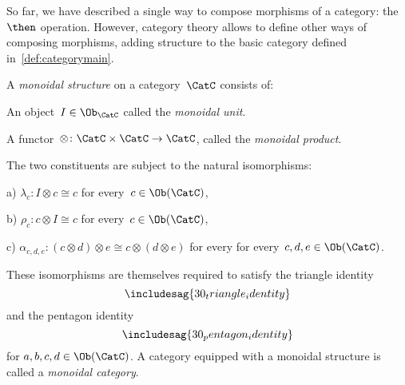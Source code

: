 So far, we have described a single way to compose morphisms of a category: the~$\then$ operation. However, category theory allows to define other ways of composing morphisms, adding structure to the basic category defined in~\cref{def:categorymain}.
\begin{ctdefinition}\label{def:monoidal_cat}
A \emph{monoidal structure} on a category~$\CatC$ consists of:
\begin{compactenum}
    \item An object~$I\in \Ob_\CatC$ called the \emph{monoidal unit}.
    \item A functor~$\otimes \colon \CatC \times \CatC\to \CatC$, called the \emph{monoidal product}.
\end{compactenum}
The two constituents are subject to the natural isomorphisms:
\begin{compactenum}
    \item[a)] $\lambda_c \colon I\otimes c \cong c$ for every~$c\in \Ob(\CatC)$,
    \item[b)] $\rho_c \colon c\otimes I \cong c$ for every~$c\in \Ob(\CatC)$,
    \item[c)] $\alpha_{c,d,e}\colon (c\otimes d)\otimes e \cong c\otimes (d\otimes e)$ for every for every~$c,d,e\in \Ob(\CatC)$.
\end{compactenum}
These isomorphisms are themselves required to satisfy the triangle identity
\begin{equation}
\includesag{30_triangle_identity}
\end{equation}
and the pentagon identity
\begin{equation}
\includesag{30_pentagon_identity}
\end{equation}
for $a,b,c,d\in \Ob(\CatC)$.
\noindent A category equipped with a monoidal structure is called a \emph{monoidal category}.
\end{ctdefinition}

